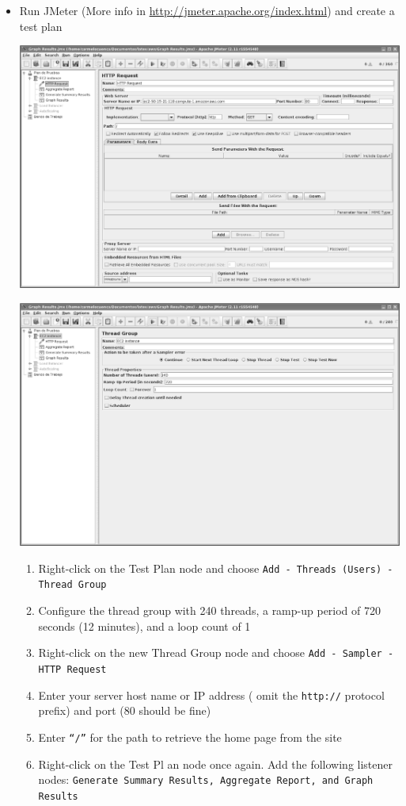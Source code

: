 \documentclass{beamer}
\begin{document}
{\begin{frame}
\begin{itemize}
\item Run JMeter (More info in \url{http://jmeter.apache.org/index.html}) and create a test plan
\begin{center}
\includegraphics[scale=0.15]{plandeprueba.eps}
\end{center}
\begin{center}
\includegraphics[scale=0.15]{plandeprueba1.eps}
\end{center}

\begin{enumerate}
\item Right-click on the Test Plan node and choose \texttt{Add - Threads (Users) - Thread Group}
\item Configure the thread group with 240 threads, a ramp-up period of 720 seconds (12 minutes), and a loop count of 1
\item Right-click on the new Thread Group node and choose \texttt{Add - Sampler - HTTP Request}
\item Enter your server host name or IP address ( omit the \texttt{http://} protocol prefix) and port (80 should be fine)
\item Enter \texttt{``/''} for the path to retrieve the home page from the site
\item Right-click on the Test Pl an node once again. Add the following listener nodes: \texttt{Generate Summary Results, Aggregate Report, and Graph Results}


\end{enumerate}
\end{itemize}
\end{frame}}
\end{document}
